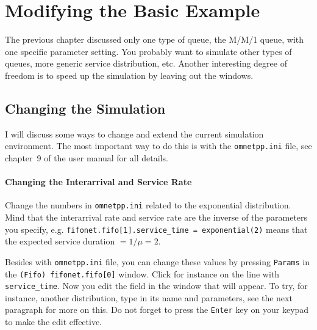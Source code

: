 \documentclass[a4paper]{article}
\begin{document}
\section{Modifying the Basic Example}
\label{sec:next-steps}
The previous chapter discussed only one type of queue, the M/M/1
queue, with one specific parameter setting. You probably want to
simulate other types of queues, more generic service distribution,
etc. Another interesting degree of freedom is to speed up the
simulation by leaving out the windows.

\subsection{Changing the  Simulation}
\label{sec:changing-basic-mm1}
I will discuss some ways to change and extend the current simulation
environment. The most important way to do this is with the
\texttt{omnetpp.ini} file, see chapter~9 of the user manual for all
details. 

\paragraph{Changing the Interarrival and Service Rate}
\label{sec:chang-inter-serv}
Change the numbers in \texttt{omnetpp.ini} related to the exponential
distribution. Mind that the interarrival rate and service rate are the
inverse of the parameters you specify, e.g.
\texttt{fifonet.fifo[1].service\_time = exponential(2)} means that the
expected service duration $ = 1/\mu = 2$.

Besides with \texttt{omnetpp.ini} file, you can change these values by
pressing \texttt{Params} in the \texttt{(Fifo) fifonet.fifo[0]} window.
Click for instance on the line with \texttt{service\_time}. Now you
edit the field in the window that will appear. To try, for instance,
another distribution, type in its name and parameters, see the next
paragraph for more on this.  Do not forget to press the \texttt{Enter}
key on your keypad to make the edit effective.
\end{document}
